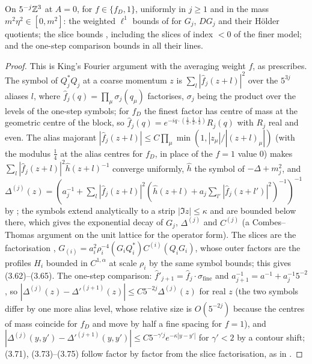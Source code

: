 \begin{proposition}\label{prop:a02:FL}
On $5^{-j}\mathbb Z^3$ at $A=0$, for $f\in\{f_D,1\}$, uniformly in $j\ge1$ and in the mass $m^2\eta^2\in[0,m^2]$: the weighted $\ell^1$ bounds of \cite[Thm.~3.3, (3.6)--(3.8)]{K1} for $G_j$, $DG_j$ and their H\"older quotients; the slice bounds \cite[Prop.~3.7, (3.62)--(3.65)]{K1}, including the slices of index $<0$ of the finer model; and the one-step comparison bounds \cite[Props.~3.8--3.9, (3.71), (3.73)--(3.75)]{K1} in all their lines.
\end{proposition}
\begin{proof}
This is King's Fourier argument \cite[Sect.~4]{K1} with the averaging weight $f$, as \cite[App.~A]{K2} prescribes. The symbol of $Q_j^*Q_j$ at a coarse momentum $z$ is $\sum_l|\hat f_j(z+l)|^2$ over the $5^{3j}$ aliases $l$, where $\hat f_j(q)=\prod_\mu\sigma_j(q_\mu)$ factorises, $\sigma_j$ being the product over the levels of the one-step symbols; for $f_D$ the finest factor has centre of mass at the geometric centre of the block, so $\hat f_j(q)=e^{-iq\cdot(\frac12,\frac12,\frac12)}R_j(q)$ with $R_j$ real and even. The alias majorant $|\hat f_j(z+l)|\le C\prod_\mu\min(1,|z_\mu|/|(z+l)_\mu|)$ (with the modulus $\frac14$ at the alias centres for $f_D$, in place of the $f=1$ value $0$) makes $\sum_l|\hat f_j(z+l)|^2\hat h(z+l)^{-1}$ converge uniformly, $\hat h$ the symbol of $-\Delta+m_j^2$, and $\Delta^{(j)}(z)=(a_j^{-1}+\sum_l|\hat f_j(z+l)|^2(\hat h(z+l)+a_j\sum_{l'}|\hat f_j(z+l')|^2)^{-1})^{-1}$ by \cite[(4.2)]{K1}; the symbols extend analytically to a strip $|\Im z|\le\kappa$ and are bounded below there, which gives the exponential decay of $G_j$, $\Delta^{(j)}$ and $C^{(j)}$ (a Combes--Thomas argument on the unit lattice for the operator form). The slices are the factorisation \cite[(2.17)]{K1}, $G_{(i)}=a_i^2\rho_i^{-4}(G_iQ_i^*)C^{(i)}(Q_iG_i)$, whose outer factors are the profiles $H_i$ bounded in $C^{1,\alpha}$ at scale $\rho_i$ by the same symbol bounds; this gives (3.62)--(3.65). The one-step comparison: $\hat f'_{j+1}=\hat f_j\cdot\sigma_{\text{fine}}$ and $a_{j+1}^{-1}=a^{-1}+a_j^{-1}5^{-2}$, so $|\Delta^{(j)}(z)-\Delta'^{(j+1)}(z)|\le C5^{-2j}\Delta^{(j)}(z)$ for real $z$ (the two symbols differ by one more alias level, whose relative size is $O(5^{-2j})$ because the centres of mass coincide for $f_D$ and move by half a fine spacing for $f=1$), and $|\Delta^{(j)}(y,y')-\Delta'^{(j+1)}(y,y')|\le C5^{-\gamma'j}e^{-\kappa|y-y'|}$ for $\gamma'<2$ by a contour shift; (3.71), (3.73)--(3.75) follow factor by factor from the slice factorisation, as in \cite[Sect.~4]{K1}.
\end{proof}

